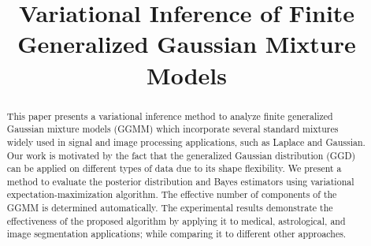 \documentclass[conference]{IEEEtran}
\begin{document}
\title{Variational Inference of Finite Generalized Gaussian Mixture Models\\
}
\author{
\and
{}
\and
{}
\and
{}
}
\maketitle

\begin{abstract}
    This paper presents a variational inference method to analyze finite generalized Gaussian mixture models (GGMM) which incorporate several standard mixtures widely used in signal and image processing applications, such as Laplace and Gaussian. Our work is motivated by the fact that the generalized Gaussian distribution (GGD) can be applied on different types of data due to its shape flexibility. We present a method to evaluate the posterior distribution and Bayes estimators using variational expectation-maximization algorithm. 
    The effective number of components of the GGMM is determined automatically. The experimental results demonstrate the effectiveness of the proposed algorithm by applying it to
    medical, astrological, and image segmentation applications; while comparing it to different other approaches.    
\end{abstract}
\end{document}
